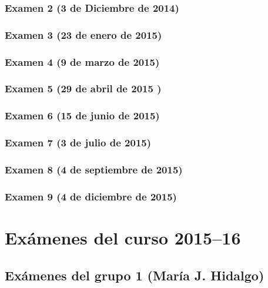 \documentclass[a4paper,12pt,twoside]{book}
\begin{document}
\subsection{Examen 2 (3 de Diciembre de 2014)}
\subsection{Examen 3 (23 de enero de 2015)}
 \label{examen_14_15_5_3}
\subsection{Examen 4 (9 de marzo de 2015)}
\subsection{Examen 5 (29 de abril de 2015 )}
\subsection{Examen 6 (15 de junio de 2015)}
\subsection{Examen 7 (3 de julio de 2015)}
 \label{examen_14_15_5_7}
\subsection{Examen 8 (4 de septiembre de 2015)}
 \label{examen_14_15_5_8}
\subsection{Examen 9 (4 de diciembre de 2015)}
 \label{examen_14_15_5_9}

\chapter{Exámenes del curso 2015--16}

\section{Exámenes del grupo 1 (María J. Hidalgo)}
\end{document}
